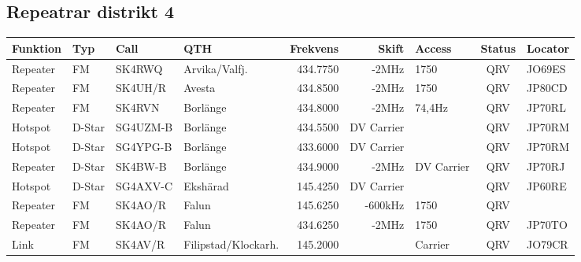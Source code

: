 \begin{landscape}
\subsection{Repeatrar distrikt 4}
\footnotesize
\begin{longtable}{llllrrlcl}
	\textbf{Funktion}         & \textbf{Typ}  & \textbf{Call} & \textbf{QTH}        & \textbf{Frekvens} & \textbf{Skift} & \textbf{Access}  & \textbf{Status} & \textbf{Locator} \\ \hline
	\endhead
	Repeater                  & FM            & SK4RWQ        & Arvika/Valfj.       & 434.7750          & -2MHz          & 1750             & QRV             & JO69ES           \\
	Repeater                  & FM            & SK4UH/R       & Avesta              & 434.8500          & -2MHz          & 1750             & QRV             & JP80CD           \\
	Repeater                  & FM            & SK4RVN        & Borlänge            & 434.8000          & -2MHz          & 74,4Hz           & QRV             & JP70RL           \\
	Hotspot                   & D-Star        & SG4UZM-B      & Borlänge            & 434.5500          & DV Carrier     &                  & QRV             & JP70RM           \\
	Hotspot                   & D-Star        & SG4YPG-B      & Borlänge            & 433.6000          & DV Carrier     &                  & QRV             & JP70RM           \\
	Repeater                  & D-Star        & SK4BW-B       & Borlänge            & 434.9000          & -2MHz          & DV Carrier       & QRV             & JP70RJ           \\
	Hotspot                   & D-Star        & SG4AXV-C      & Ekshärad            & 145.4250          & DV Carrier     &                  & QRV             & JP60RE           \\
	Repeater                  & FM            & SK4AO/R       & Falun               & 145.6250          & -600kHz        & 1750             & QRV             & \\
	Repeater                  & FM            & SK4AO/R       & Falun               & 434.6250          & -2MHz          & 1750             & QRV             & JP70TO           \\
	Link                      & FM            & SK4AV/R       & Filipstad/Klockarh. & 145.2000          &                & Carrier          & QRV             & JO79CR           \\

\end{longtable}
\end{landscape}
